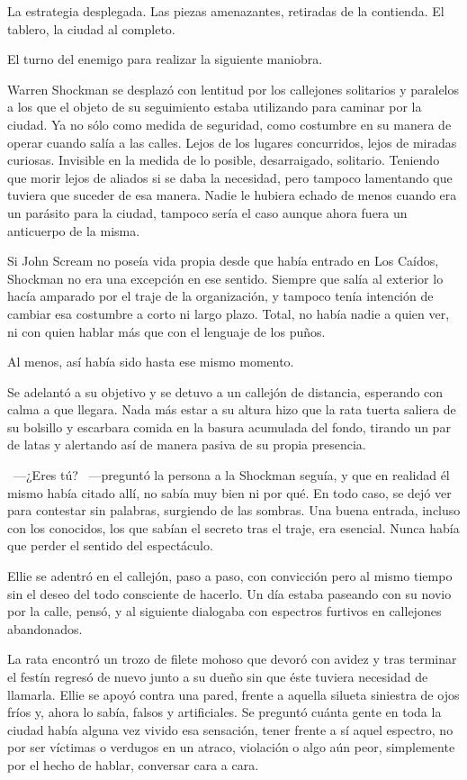 La estrategia desplegada. Las piezas amenazantes, retiradas de la contienda. El tablero, la ciudad al completo.

El turno del enemigo para realizar la siguiente maniobra.

\fancyparbreak
Warren Shockman se desplazó con lentitud por los callejones solitarios y paralelos a los que el objeto de su seguimiento estaba utilizando para caminar por la ciudad. Ya no sólo como medida de seguridad, como costumbre en su manera de operar cuando salía a las calles. Lejos de los lugares concurridos, lejos de miradas curiosas. Invisible en la medida de lo posible, desarraigado, solitario. Teniendo que morir lejos de aliados si se daba la necesidad, pero tampoco lamentando que tuviera que suceder de esa manera. Nadie le hubiera echado de menos cuando era un parásito para la ciudad, tampoco sería el caso aunque ahora fuera un anticuerpo de la misma.

Si John Scream no poseía vida propia desde que había entrado en Los Caídos, Shockman no era una excepción en ese sentido. Siempre que salía al exterior lo hacía amparado por el traje de la organización, y tampoco tenía intención de cambiar esa costumbre a corto ni largo plazo. Total, no había nadie a quien ver, ni con quien hablar más que con el lenguaje de los puños.

Al menos, así había sido hasta ese mismo momento.

Se adelantó a su objetivo y se detuvo a un callejón de distancia, esperando con calma a que llegara. Nada más estar a su altura hizo que la rata tuerta saliera de su bolsillo y escarbara comida en la basura acumulada del fondo, tirando un par de latas y alertando así de manera pasiva de su propia presencia.

~---¿Eres tú? ~---preguntó la persona a la Shockman seguía, y que en realidad él mismo había citado allí, no sabía muy bien ni por qué. En todo caso, se dejó ver para contestar sin palabras, surgiendo de las sombras. Una buena entrada, incluso con los conocidos, los que sabían el secreto tras el traje, era esencial. Nunca había que perder el sentido del espectáculo.

Ellie se adentró en el callejón, paso a paso, con convicción pero al mismo tiempo sin el deseo del todo consciente de hacerlo. Un día estaba paseando con su novio por la calle, pensó, y al siguiente dialogaba con espectros furtivos en callejones abandonados.

La rata encontró un trozo de filete mohoso que devoró con avidez y tras terminar el festín regresó de nuevo junto a su dueño sin que éste tuviera necesidad de llamarla. Ellie se apoyó contra una pared, frente a aquella silueta siniestra de ojos fríos y, ahora lo sabía, falsos y artificiales. Se preguntó cuánta gente en toda la ciudad había alguna vez vivido esa sensación, tener frente a sí aquel espectro, no por ser víctimas o verdugos en un atraco, violación o algo aún peor, simplemente por el hecho de hablar, conversar cara a cara.

